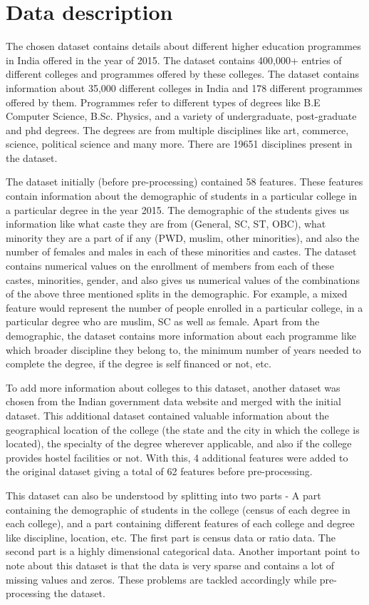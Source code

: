 \section{Data description}
The chosen dataset contains details about different higher education programmes in India offered in the year of 2015. The dataset contains 400,000+ entries  of different colleges and programmes offered by these colleges. The dataset contains information about 35,000 different colleges in India and 178 different programmes offered by them. Programmes refer to different types of degrees like B.E Computer Science, B.Sc. Physics, and a variety of undergraduate, post-graduate and phd degrees. The degrees are from multiple disciplines like art, commerce, science, political science and many more. There are 19651 disciplines present in the dataset. 

The dataset initially (before pre-processing) contained 58 features. These features contain information about the demographic of students in a particular college in a particular degree in the year 2015. The demographic of the students gives us information like what caste they are from (General, SC, ST, OBC), what minority they are a part of if any (PWD, muslim, other minorities), and also the number of females and males in each of these minorities and castes. The dataset contains numerical values on the enrollment of members from each of these castes, minorities, gender, and also gives us numerical values of the combinations of the above three mentioned splits in the demographic. For example, a mixed feature would represent the number of people enrolled in a particular college, in a particular degree who are muslim, SC as well as female. 
Apart from the demographic, the dataset contains more information about each programme like which broader discipline they belong to, the minimum number of years needed to complete the degree, if the degree is self financed or not, etc. 

To add more information about colleges to this dataset, another dataset \cite{b5} was chosen from the Indian government data website and merged with the initial dataset. This additional dataset contained valuable information about the geographical location of the college (the state and the city in which the college is located), the specialty of the degree wherever applicable, and also if the college provides hostel facilities or not. With this, 4 additional features were added to the original dataset giving a total of 62 features before pre-processing.  

This dataset can also be understood by splitting into two parts - A part containing the demographic of students in the college (census of each degree in each college), and a part containing different features of each college and degree like discipline, location, etc. The first part is census data or ratio data. The second part is a highly dimensional categorical data. Another important point to note about this dataset is that the data is very sparse and contains a lot of missing values and zeros. These problems are tackled accordingly while pre-processing the dataset. 